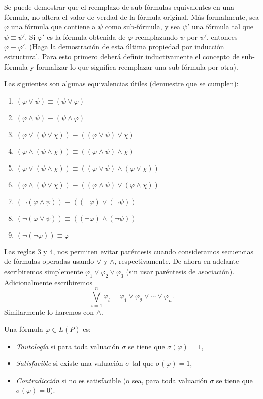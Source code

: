 Se puede demostrar que el reemplazo de sub-f\'ormulas equivalentes en una f\'ormula, no
altera el valor de verdad de la f\'ormula original.
M\'as formalmente, sea $\varphi$ una f\'ormula que contiene a $\psi$ como sub-f\'ormula, y sea
$\psi'$ una f\'ormula tal que $\psi\equiv \psi'$. 
Si $\varphi'$ es la f\'ormula obtenida de $\varphi$ reemplazando $\psi$ por $\psi'$, entonces $\varphi\equiv \varphi'$.
(Haga la demostraci\'on de esta \'ultima propiedad por inducci\'on estructural. Para
esto primero deber\'a definir inductivamente el concepto de sub-f\'ormula y formalizar
lo que significa reemplazar una sub-f\'ormula por otra).

Las siguientes son algunas equivalencias \'utiles (demuestre que se cumplen):
\begin{enumerate}
\item $(\varphi \vee \psi) \equiv (\psi \vee \varphi)$
\item $(\varphi \wedge \psi) \equiv (\psi \wedge \varphi)$
\item $(\varphi \vee (\psi \vee \chi)) \equiv ((\varphi \vee \psi) \vee \chi)$
\item $(\varphi \wedge (\psi \wedge \chi)) \equiv ((\varphi \wedge \psi) \wedge \chi)$
\item $(\varphi \vee (\psi \wedge \chi)) \equiv ((\varphi \vee \psi) \wedge (\varphi \vee \chi))$
\item $(\varphi \wedge (\psi \vee \chi)) \equiv ((\varphi \wedge \psi) \vee (\varphi \wedge \chi))$
\item $(\neg (\varphi \wedge \psi))\equiv ((\neg \varphi) \vee (\neg \psi))$
\item $(\neg (\varphi \vee \psi))\equiv ((\neg \varphi) \wedge (\neg \psi))$
\item $(\neg(\neg \varphi))\equiv \varphi$
\end{enumerate}

Las reglas 3 y 4, nos permiten evitar par\'entesis cuando consideramos secuencias de f\'ormulas operadas
usando $\vee$ y $\wedge$, respectivamente. 
De ahora en adelante escribiremos simplemente $\varphi_1 \vee \varphi_2 \vee \varphi_3$ (sin usar
par\'entesis de asociaci\'on).
Adicionalmente escribiremos 
\[
\bigvee_{i=1}^{n}\varphi_i = \varphi_1 \vee \varphi_2 \vee \cdots \vee \varphi_n.
\] Similarmente lo haremos con $\wedge$.

\begin{definicion}
Una f\'ormula $\varphi\in L(P)$ es:
\begin{itemize}
\item {\em Tautolog\'{i}a} si para toda valuaci\'on $\sigma$ se tiene que $\sigma(\varphi)=1$,
\item {\em Satisfacible} si existe una valuaci\'on $\sigma$ tal que $\sigma(\varphi)=1$,
\item {\em Contradicci\'on} si no es satisfacible (o sea, para toda valuaci\'on $\sigma$ se tiene que $\sigma(\varphi)=0$). 
\end{itemize}
\end{definicion}

